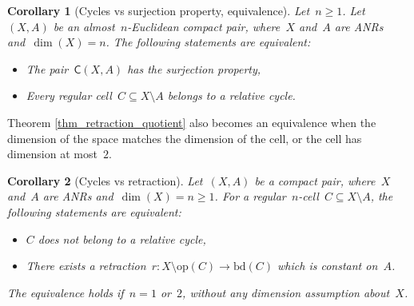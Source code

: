 \documentclass[english,11pt]{article}
\theoremstyle{plain}
\newtheorem{corollary}{Corollary}[section]
\theoremstyle{remark}
\theoremstyle{definition}
\newcommand{\bd}[1]{\mathrm{bd}(#1)}
\newcommand{\op}[1]{\mathrm{op}(#1)}
\newcommand{\Sp}{\mathbb{S}}
\newcommand{\R}{\mathbb{R}}
\newcommand{\Z}{\mathbb{Z}}
\newcommand{\RZ}{\mathbb{T}}%
\newcommand{\C}[1]{\mathsf{C}(#1)}%
\begin{document}
\begin{corollary}[Cycles vs surjection property, equivalence]\label{cor_equivalence}
Let~$n\geq 1$. Let~$(X,A)$ be an almost~$n$-Euclidean compact pair, where~$X$ and~$A$ are ANRs and~$\dim(X)=n$. The following statements are equivalent:
\begin{itemize}
\item The pair~$\C{X,A}$ has the surjection property,
\item Every regular cell~$C\subseteq X\setminus A$ belongs to a relative cycle.
\end{itemize}
\end{corollary}

Theorem \ref{thm_retraction_quotient} also becomes an equivalence when the dimension of the space matches the dimension of the cell, or the cell has dimension at most~$2$. 
\begin{corollary}[Cycles vs retraction]\label{cor_retraction}
Let~$(X,A)$ be a compact pair, where~$X$ and~$A$ are ANRs and~$\dim(X)=n\geq 1$. For a regular~$n$-cell~$C\subseteq X\setminus A$, the following statements are equivalent:
\begin{itemize}
\item $C$ does not belong to a relative cycle,
\item There exists a retraction~$r:X\setminus \op{C}\to\bd{C}$ which is constant on~$A$.%
\end{itemize}

The equivalence holds if~$n=1$ or~$2$, without any dimension assumption about~$X$.
\end{corollary}
\end{document}
